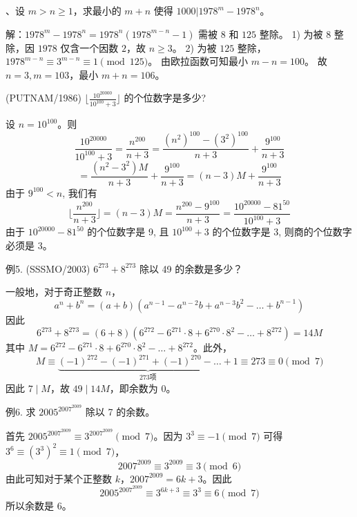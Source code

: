 \begin{questions}
、设 $m > n \ge 1$，求最小的 $m+n$ 使得 $1000 | 1978^m - 1978^n$。

\begin{solution}
解：$1978^m - 1978^n = 1978^n(1978^{m-n} - 1)$ 需被 $8$ 和 $125$ 整除。
1) 为被 $8$ 整除，因 $1978$ 仅含一个因数 $2$，故 $n \ge 3$。
2) 为被 $125$ 整除，$1978^{m-n} \equiv 3^{m-n} \equiv 1 \pmod{125}$。
由欧拉函数可知最小 $m-n = 100$。
故 $n=3, m=103$，最小 $m+n = 106$。
\end{solution}

\question (PUTNAM/1986) $\lfloor \frac{10^{20000}}{10^{100} + 3} \rfloor$ 的个位数字是多少?

\begin{solution}
设 $n = 10^{100}$。则
\[
\frac{10^{20000}}{10^{100} + 3} = \frac{n^{200}}{n + 3} = \frac{(n^2)^{100} - (3^2)^{100}}{n + 3} + \frac{9^{100}}{n + 3}
\]
\[
= \frac{(n^2 - 3^2) M}{n + 3} + \frac{9^{100}}{n + 3} = (n - 3) M + \frac{9^{100}}{n + 3}
\]
由于 $9^{100} < n$, 我们有
\[
\lfloor \frac{n^{200}}{n + 3} \rfloor = (n - 3) M = \frac{n^{200} - 9^{100}}{n + 3} = \frac{10^{20000} - 81^{50}}{10^{100} + 3}
\]
由于 $10^{20000} - 81^{50}$ 的个位数字是 9, 且 $10^{100} + 3$ 的个位数字是 3, 则商的个位数字必须是 3。
\end{solution}

\question 例5. (SSSMO/2003) $6^{273} + 8^{273}$ 除以 49 的余数是多少？
\begin{solution}
一般地，对于奇正整数 $n$，
\[
a^n + b^n = (a + b)(a^{n-1} - a^{n-2}b + a^{n-3}b^2 - \dots + b^{n-1})
\]
因此
\[
6^{273} + 8^{273} = (6 + 8)(6^{272} - 6^{271} \cdot 8 + 6^{270} \cdot 8^2 - \dots + 8^{272}) = 14M
\]
其中 $M = 6^{272} - 6^{271} \cdot 8 + 6^{270} \cdot 8^2 - \dots + 8^{272}$。此外，
\[
M \equiv \underbrace{(-1)^{272} - (-1)^{271} + (-1)^{270} - \dots + 1}_{273 \text{项}} \equiv 273 \equiv 0 \pmod 7
\]
因此 $7 \mid M$，故 $49 \mid 14M$，即余数为 0。
\end{solution}

\question 例6. 求 $2005^{2007^{2009}}$ 除以 7 的余数。
\begin{solution}
首先 $2005^{2007^{2009}} \equiv 3^{2007^{2009}} \pmod 7$。因为 $3^3 \equiv -1 \pmod 7$ 可得 $3^6 \equiv (3^3)^2 \equiv 1 \pmod 7$，
\[
2007^{2009} \equiv 3^{2009} \equiv 3 \pmod 6
\]
由此可知对于某个正整数 $k$，$2007^{2009} = 6k + 3$。因此
\[
2005^{2007^{2009}} \equiv 3^{6k+3} \equiv 3^3 \equiv 6 \pmod 7
\]
所以余数是 6。
\end{solution}


\end{questions}
